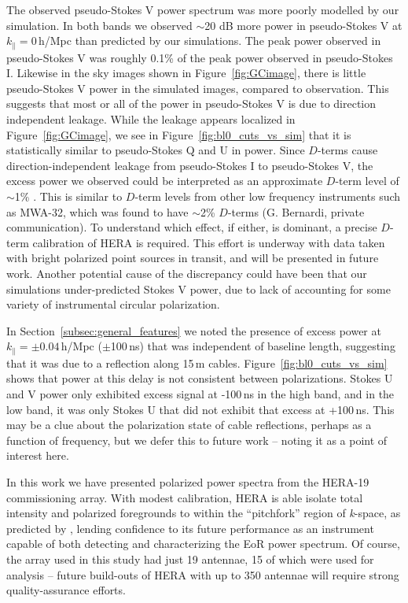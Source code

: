 \documentclass[twocolumn, trackchanges]{aastex61}
\begin{document}
The observed pseudo-Stokes V power spectrum was more poorly modelled by our simulation. In both bands we observed $\sim$20 dB more power in pseudo-Stokes V at $k_{\parallel}=0$\,h/Mpc than predicted by our simulations. The peak power observed in pseudo-Stokes V was roughly 0.1\% of the peak power observed in pseudo-Stokes I. Likewise in the sky images shown in Figure~\ref{fig:GCimage}, there is little pseudo-Stokes V power in the simulated images, compared to observation. This suggests that most or all of the power in pseudo-Stokes V is due to direction independent leakage. While the leakage appears localized in Figure~\ref{fig:GCimage}, we see in Figure~\ref{fig:bl0_cuts_vs_sim} that it is statistically similar to pseudo-Stokes Q and U in power.
Since $D$-terms cause direction-independent leakage from pseudo-Stokes I to pseudo-Stokes V, the excess power we observed could be interpreted as an approximate $D$-term level of $\sim$1\% \citep{TMS}. This is similar to $D$-term levels from other low frequency instruments such as MWA-32, which was found to have $\sim$2\% $D$-terms (G. Bernardi, private communication).
To understand which effect, if either, is dominant, a precise $D$-term calibration of HERA is required. This effort is underway with data taken with bright polarized point sources in transit, and will be presented in future work. Another potential cause of the discrepancy could have been that our simulations under-predicted Stokes V power, due to lack of accounting for some variety of instrumental circular polarization.

In Section~\ref{subsec:general_features} we noted the presence of excess power at $k_{\parallel}=\pm 0.04$\,h/Mpc ($\pm$100\,ns) that was independent of baseline length, suggesting that it was due to a reflection along 15\,m cables. Figure~\ref{fig:bl0_cuts_vs_sim} shows that power at this delay is not consistent between polarizations. Stokes U and V power only exhibited excess signal at -100\,ns in the high band, and in the low band, it was only Stokes U that did not exhibit that excess at +100\,ns. This may be a clue about the polarization state of cable reflections, perhaps as a function of frequency, but we defer this to future work -- noting it as a point of interest here.

\label{conc}

In this work we have presented polarized power spectra from the HERA-19 commissioning array. With modest calibration, HERA is able isolate total intensity and polarized foregrounds to within the ``pitchfork'' region of \textit{k}-space, as predicted by \cite{Nithya.15b}, lending confidence to its future performance as an instrument capable of both detecting and characterizing the EoR power spectrum. Of course, the array used in this study had just 19 antennae, 15 of which were used for analysis -- future build-outs of HERA with up to 350 antennae will require strong quality-assurance efforts. %
\end{document}
